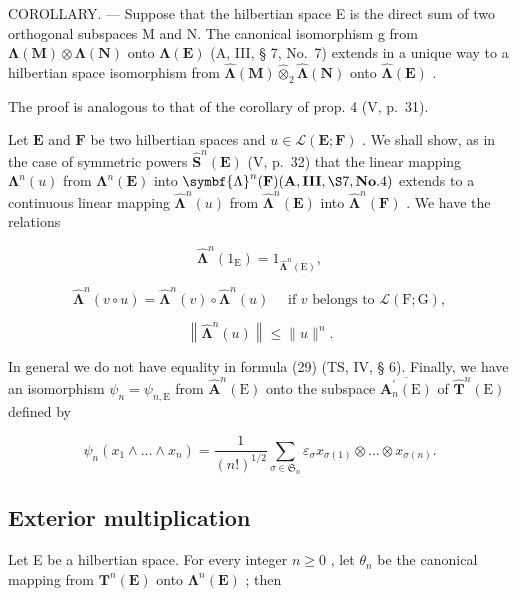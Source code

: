 COROLLARY. --- Suppose that the hilbertian space E is the direct sum of two orthogonal subspaces M and N. The canonical isomorphism g from \(\symbf{\Lambda}(\mathbf{M})\otimes\symbf{\Lambda}(\mathbf{N})\) onto \(\symbf{\Lambda}(\mathbf{E})\) (A, III, § 7, No.~7) extends in a unique way to a hilbertian space isomorphism from \(\hat{\symbf{\Lambda}}(\mathbf{M})\hat{\otimes}_{2}\hat{\symbf{\Lambda}}(\mathbf{N})\) onto \(\hat{\symbf{\Lambda}}(\mathbf{E})\) .

The proof is analogous to that of the corollary of prop. 4 (V, p.~31).

Let \(\mathbf{E}\) and \(\mathbf{F}\) be two hilbertian spaces and \(u \in \mathcal{L}(\mathbf{E};\mathbf{F})\) . We shall show, as in the case of symmetric powers \(\hat{\mathbf{S}}^n (\mathbf{E})\) (V, p.~32) that the linear mapping \(\symbf{\Lambda}^n (u)\) from \(\symbf{\Lambda}^n (\mathbf{E})\) into \(\symbf{\Lambda}^n (\mathbf{F})(\mathbf{A},\mathbf{III},\S 7,\mathbf{No}.4)\) extends to a continuous linear mapping \(\hat{\symbf{\Lambda}}^n (u)\) from \(\hat{\symbf{\Lambda}}^n (\mathbf{E})\) into \(\hat{\symbf{\Lambda}}^n (\mathbf{F})\) . We have the relations

\[
\hat {\symbf {\Lambda}} ^ {n} (1 _ {\mathrm{E}}) = 1 _ {\hat {\symbf {\Lambda}} ^ {n} (\mathrm{E})},\tag{27}
\]

\[
\hat {\symbf {\Lambda}} ^ {n} (v \circ u) = \hat {\symbf {\Lambda}} ^ {n} (v) \circ \hat {\symbf {\Lambda}} ^ {n} (u) \quad \text { if } v \text { belongs   to } \mathscr {L} (\mathrm{F}; \mathrm{G}),\tag{28}
\]

\[
\left\| \hat {\symbf {\Lambda}} ^ {n} (u) \right\| \leqslant \| u \| ^ {n}.\tag{29}
\]

In general we do not have equality in formula (29) (TS, IV, § 6). Finally, we have an isomorphism \(\psi_{n} = \psi_{n,\mathrm{E}}\) from \(\hat{\mathbf{A}}^{n}(\mathrm{E})\) onto the subspace \(\overline{\mathbf{A}_{n}^{\prime}(\mathrm{E})}\) of \(\hat{\mathbf{T}}^{n}(\mathrm{E})\) defined by

\[
\psi_ {n} (x _ {1} \wedge \dots \wedge x _ {n}) = \frac {1}{(n !) ^ {1 / 2}} \sum_ {\sigma \in \mathfrak {S} _ {n}} \varepsilon_ {\sigma} x _ {\sigma (1)} \otimes \dots \otimes x _ {\sigma (n)}.\tag{30}
\]

\subsection{Exterior multiplication}

Let E be a hilbertian space. For every integer \(n \geqslant 0\) , let \(\theta_{n}\) be the canonical mapping from \(\mathbf{T}^{n}(\mathbf{E})\) onto \(\symbf{\Lambda}^{n}(\mathbf{E})\) ; then

